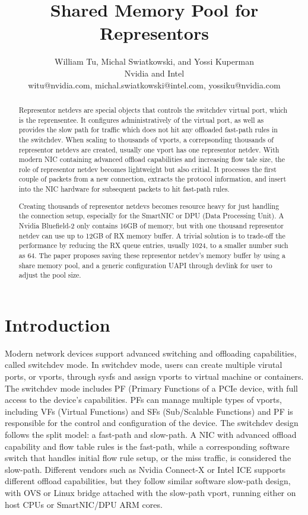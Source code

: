 \documentclass[letterpaper]{article}
\title{Shared Memory Pool for Representors}
\author{William Tu, Michal Swiatkowski, and Yossi Kuperman\\
Nvidia and Intel\\
witu@nvidia.com, michal.swiatkowski@intel.com, yossiku@nvidia.com\\
\newline
\newline
}
\begin{document}
 
\maketitle
\begin{abstract}
Representor netdevs are special objects that controls the switchdev
virtual port, which is the reprensentee. It configures administratively
of the virtual port, as well as provides the slow path for traffic which
does not hit any offloaded fast-path rules in the switchdev.
When scaling to thousands of vports, a correpsonding thousands of
representor netdevs are created, usually one vport has one representor
netdev. With modern NIC containing advanced offload capabilities %
and increasing flow tale size, the role of representor netdev becomes
lightweight but also critial. It processes the first couple of packets
from a new connection, extracts the protocol information, and insert
into the NIC hardware for subsequent packets to hit fast-path rules. 

Creating thousands of representor netdevs becomes resource heavy for
just handling the connection setup, especially for the SmartNIC or
DPU (Data Processing Unit). A Nvidia Bluefield-2 only contains 16GB
of memory, but with one thousand representor netdev can use up to
12GB of RX memory buffer. A trivial solution is to trade-off the
performance by reducing the RX queue entries, usually 1024, to a
smaller number such as 64. The paper proposes saving these representor
netdev's memory buffer by using a share memory pool, and a generic
configuration UAPI through devlink for user to adjust the pool size. 
 
\end{abstract}

\section{Introduction}
Modern network devices support advanced switching and offloading
capabilities, called switchdev mode. In switchdev mode, users can
create multiple virutal ports, or vports, through sysfs and assign
vports to virtual machine or containers. The switchdev mode includes
PF (Primary Functions of a PCIe device, with full access to the device's
capabilities. PFs can manage multiple types of vports, including
VFs (Virtual Functions) and SFs (Sub/Scalable Functions) and PF is
responsible for the control and configuration of the device.
The switchdev design follows the split model: a fast-path and slow-path.
A NIC with advanced offload capability and flow table rules is
the fast-path, while a corresponding software switch that handles
initial flow rule setup, or the miss traffic, is considered the
slow-path. Different vendors such as Nvidia Connect-X or Intel ICE
supports different offload capabilities, but they follow similar
software slow-path design, with OVS or Linux bridge attached with
the slow-path vport, running either on host CPUs or SmartNIC/DPU
ARM cores.
\end{document}
